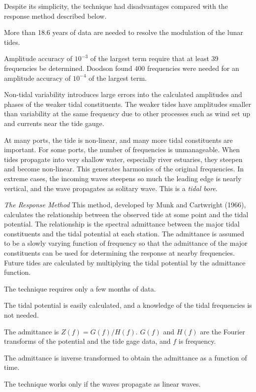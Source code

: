 Despite its simplicity, the technique had disadvantages compared with
the response method described below.
\begin{enumerate}
\vitem More than 18.6 years of data are needed to resolve the
modulation of the lunar tides.

\vitem Amplitude accuracy of $10^{-3}$ of the
largest term require that at least 39 frequencies be
determined. Doodson found 400 frequencies were needed for an amplitude
accuracy of $10^{-4}$ of the largest term.

\vitem Non-tidal variability introduces large errors into the
calculated amplitudes and phases of the weaker tidal constituents. The
weaker tides have amplitudes smaller than variability at the same
frequency due to other processes such as wind set up and currents near
the tide gauge.

\vitem At many ports, the tide is non-linear, and many more tidal
constituents are important. For some ports, the number of frequencies
is unmanageable. When tides propagate into very shallow water,
especially river estuaries, they steepen and become non-linear. This
generates harmonics of the original frequencies. In extreme cases, the
incoming waves steepens so much the leading edge is nearly vertical,
and the wave propagates as solitary wave. This
is a \textit{tidal bore}.
\end{enumerate}

\textit{The Response Method} This method, developed by Munk and Cartwright (1966),
calculates the relationship between the observed tide at some point
and the tidal potential. The relationship is the spectral admittance
between the major tidal constituents and the tidal potential at each
station. The admittance is assumed to be a slowly varying function of
frequency so that the admittance of the major constituents can be used
for determining the response at nearby frequencies. Future tides are
calculated by multiplying the tidal potential by the admittance
function.
\begin{enumerate}
\vitem The technique requires only a few months of data.

\vitem The tidal potential is easily calculated, and a knowledge of
the tidal frequencies is not needed.

\vitem The admittance is $Z(f) = G(f)/H(f)$. $G(f)$ and $H(f)$ are the
Fourier transforms of the potential and the tide gage data, and $f$ is
frequency.

\vitem The admittance is inverse transformed to obtain the admittance
as a function of time.

\vitem The technique works only if the waves propagate as linear
waves.
\end{enumerate}

